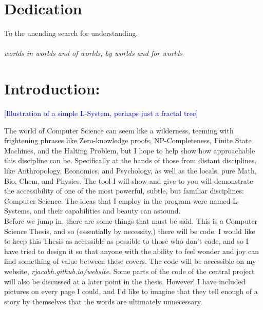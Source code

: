 \documentclass[12pt,twoside]{reedthesis}
\begin{document}
\chapter*{Dedication}
	To the unending search for understanding. \\\\
	\textit{worlds in worlds and of worlds, by worlds and for worlds}

  \mainmatter %
  \pagestyle{fancyplain} %

\chapter{Introduction: }
	
\textcolor{blue}{[Illustration of a simple L-System, perhaps just a fractal tree]}

The world of Computer Science can seem like a wilderness, teeming with frightening phrases like Zero-knowledge proofs, NP-Completeness, Finite State Machines, and the Halting Problem, but I hope to help show how approachable this discipline can be. Specifically at the hands of those from distant disciplines, like Anthropology, Economics, and Psychology, as well as the locals, pure Math, Bio, Chem, and Physics. The tool I will show and give to you will demonstrate the accessibility of one of the most powerful, subtle, but familiar disciplines: Computer Science. The ideas that I employ in the program were named L-Systems, and their capabilities and beauty can astound.\\
	
Before we jump in, there are some things that must be said. This is a Computer Science Thesis, and so (essentially by necessity,) there will be code. I would like to keep this Thesis as accessible as possible to those who don’t code, and so I have tried to design it so that anyone with the ability to feel wonder and joy can find something of value between these covers. The code will be accessible on my website, \textit{rjacobh.github.io/website}. Some parts of the code of the central project will also be discussed at a later point in the thesis. However! I have included pictures on every page I could, and I’d like to imagine that they tell enough of a story by themselves that the words are ultimately unnecessary.\\
\end{document}
